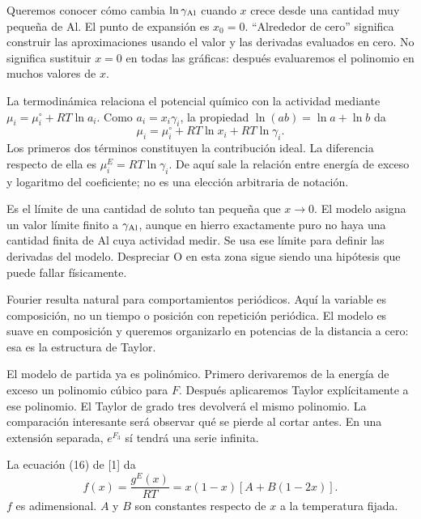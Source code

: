 Queremos conocer cómo cambia $\ln\gamma_{\mathrm{Al}}$ cuando $x$ crece desde una cantidad muy pequeña de Al. El punto de expansión es $x_0=0$. ``Alrededor de cero'' significa construir las aproximaciones usando el valor y las derivadas evaluados en cero. No significa sustituir $x=0$ en todas las gráficas: después evaluaremos el polinomio en muchos valores de $x$.

La termodinámica relaciona el potencial químico con la actividad mediante $\mu_i=\mu_i^\circ+RT\ln a_i$. Como $a_i=x_i\gamma_i$, la propiedad $\ln(ab)=\ln a+\ln b$ da
\[
\mu_i=\mu_i^\circ+RT\ln x_i+RT\ln\gamma_i.
\]
Los primeros dos términos constituyen la contribución ideal. La diferencia respecto de ella es $\mu_i^E=RT\ln\gamma_i$. De aquí sale la relación entre energía de exceso y logaritmo del coeficiente; no es una elección arbitraria de notación.

Es el límite de una cantidad de soluto tan pequeña que $x\to0$. El modelo asigna un valor límite finito a $\gamma_{\mathrm{Al}}$, aunque en hierro exactamente puro no haya una cantidad finita de Al cuya actividad medir. Se usa ese límite para definir las derivadas del modelo. Despreciar O en esta zona sigue siendo una hipótesis que puede fallar físicamente.

Fourier resulta natural para comportamientos periódicos. Aquí la variable es composición, no un tiempo o posición con repetición periódica. El modelo es suave en composición y queremos organizarlo en potencias de la distancia a cero: esa es la estructura de Taylor.

El modelo de partida ya es polinómico. Primero derivaremos de la energía de exceso un polinomio cúbico para $F$. Después aplicaremos Taylor explícitamente a ese polinomio. El Taylor de grado tres devolverá el mismo polinomio. La comparación interesante será observar qué se pierde al cortar antes. En una extensión separada, $e^{F_3}$ sí tendrá una serie infinita.


La ecuación (16) de [1] da
\[
f(x)=\frac{g^E(x)}{RT}=x(1-x)[A+B(1-2x)].
\]
$f$ es adimensional. $A$ y $B$ son constantes respecto de $x$ a la temperatura fijada.

